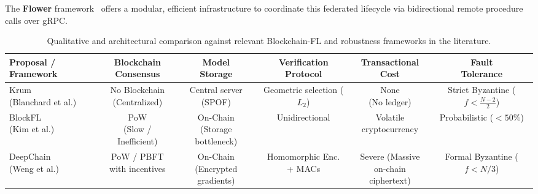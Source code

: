 The \textbf{Flower} framework~\cite{beutel2020flower} offers a modular, efficient infrastructure to coordinate this federated lifecycle via bidirectional remote procedure calls over gRPC.

\begin{table}
\caption{Qualitative and architectural comparison against relevant Blockchain-FL and robustness frameworks in the literature.}\label{tab:estado_arte}
\footnotesize
\setlength{\tabcolsep}{3.5pt}
\renewcommand{\arraystretch}{1.15}
\begin{tabular*}{\textheight}{@{\extracolsep\fill}lccccc}
\toprule
\textbf{Proposal / Framework} & \makecell{\textbf{Blockchain}\\\textbf{Consensus}} & \makecell{\textbf{Model}\\\textbf{Storage}} & \makecell{\textbf{Verification}\\\textbf{Protocol}} & \makecell{\textbf{Transactional}\\\textbf{Cost}} & \makecell{\textbf{Fault}\\\textbf{Tolerance}} \\
\midrule
\makecell[l]{Krum\\(Blanchard et al.)~\cite{blanchard2017byzantine}} & \makecell{No Blockchain\\(Centralized)} & \makecell{Central server\\(SPOF)} & \makecell{Geometric selection\\($L_2$)} & \makecell{None\\(No ledger)} & \makecell{Strict Byzantine\\($f < \frac{N-2}{2}$)} \\ \midrule
\makecell[l]{BlockFL\\(Kim et al.)~\cite{kim2019blockfl}} & \makecell{PoW\\(Slow / Inefficient)} & \makecell{On-Chain\\(Storage bottleneck)} & Unidirectional & \makecell{Volatile\\cryptocurrency} & \makecell{Probabilistic\\($< 50\%$)} \\ \midrule
\makecell[l]{DeepChain\\(Weng et al.)~\cite{weng2021deepchain}} & \makecell{PoW / PBFT\\with incentives} & \makecell{On-Chain\\(Encrypted gradients)} & \makecell{Homomorphic Enc.\\+ MACs} & \makecell{Severe (Massive\\on-chain ciphertext)} & \makecell{Formal Byzantine\\($f < N/3$)} \\ \midrule

\end{tabular*}
\end{table}
